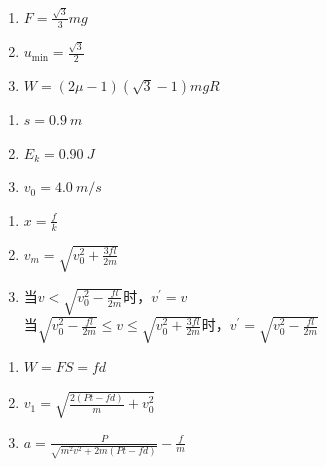 \item \begin {enumerate} \renewcommand {\labelenumi }{\arabic {enumi}.} \item $F = \frac { \sqrt { 3 } } { 3 } m g$ \item $u _ { \min } = \frac { \sqrt { 3 } } { 2 }$ \item $W = ( 2 \mu - 1 ) ( \sqrt { 3 } - 1 ) m g R$ \par \par \par \end {enumerate} \par \par 
\item \begin {enumerate} \renewcommand {\labelenumi }{\arabic {enumi}.} \item $ s=0.9\ m $ \item $ E_{k}=0.90\ J $ \item $ v_{0}=4.0\ m/s $ \par \end {enumerate} \par \par 
\item \begin {enumerate} \renewcommand {\labelenumi }{\arabic {enumi}.} \item $x = \frac { f } { k }$ \item $v _ { m } = \sqrt { v _ { 0 } ^ { 2 } + \frac { 3 f l } { 2 m } }$ \item 当$v < \sqrt { v _ { 0 } ^ { 2 } - \frac { f l } { 2 m } }$时，$v ^ { \prime } = v$ \\ 当$\sqrt { v _ { 0 } ^ { 2 } - \frac { f l } { 2 m } } \leq v \leq \sqrt { v _ { 0 } ^ { 2 } + \frac { 3 f l } { 2 m } }$时，$v ^ { \prime } = \sqrt { v _ { 0 } ^ { 2 } - \frac { f l } { 2 m } }$ \par \end {enumerate} \par \par 
\item \begin {enumerate} \renewcommand {\labelenumi }{\arabic {enumi}.} \item $W = F S = f d$ \item $v _ { 1 } = \sqrt { \frac { 2 ( P t - f d ) } { m } + v _ { 0 } ^ { 2 } }$ \item $a = \frac { P } { \sqrt { m ^ { 2 } v ^ { 2 } + 2 m ( P t - f d ) } } - \frac { f } { m }$ \par \par \par \end {enumerate} \par \par 
